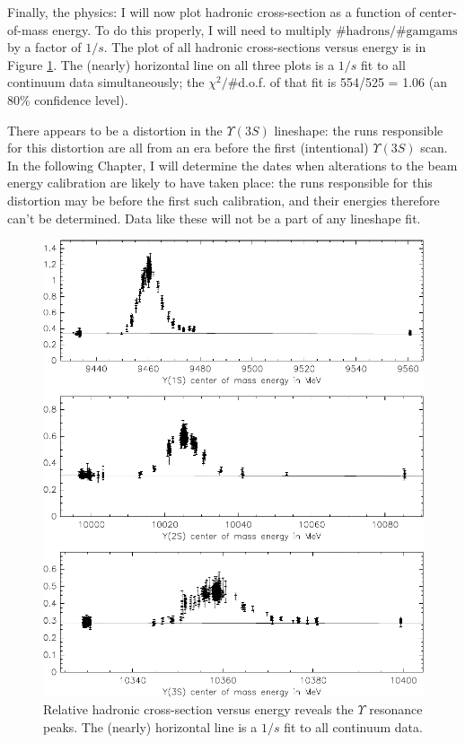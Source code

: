 Finally, the physics: I will now plot hadronic cross-section as a
function of center-of-mass energy.  To do this properly, I will need
to multiply $\mbox{\#hadrons}/\mbox{\#gamgams}$ by a factor of $1/s$.
The plot of all hadronic cross-sections versus energy is in Figure
\ref{runbyrun_thescans}.  The (nearly) horizontal line on all three
plots is a $1/s$ fit to all continuum data simultaneously; the
$\chi^2/$\#d.o.f. of that fit is 554/525 = 1.06 (an 80\% confidence
level).

There appears to be a distortion in the $\Upsilon(3S)$ lineshape: the
runs responsible for this distortion are all from an era before the
first (intentional) $\Upsilon(3S)$ scan.  In the following Chapter, I
will determine the dates when alterations to the beam energy
calibration are likely to have taken place: the runs responsible for
this distortion may be before the first such calibration, and their
energies therefore can't be determined.  Data like these will not be a
part of any lineshape fit.

\begin{figure}[p]
  \includegraphics[width=\linewidth]{plots/runbyrun_thescans}
  \caption{\label{runbyrun_thescans} Relative hadronic cross-section
  versus energy reveals the $\Upsilon$ resonance peaks.  The (nearly)
  horizontal line is a $1/s$ fit to all continuum data.}
\end{figure}
